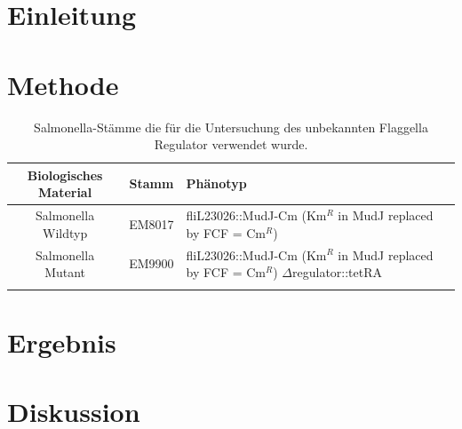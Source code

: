 \documentclass[oneside,10pt,a4paper]{report}
\begin{document}
		\section{Einleitung}
		
		\section{Methode}
			\begin{table}[H]
			\centering
			\caption{Salmonella-Stämme die für die Untersuchung des unbekannten Flaggella Regulator verwendet wurde.}
			\label{tab: exp8-biologisches Material}
			\begin{tabular}{ccp{5cm}}
				\toprule
				Biologisches Material& Stamm & Phänotyp\\
				\midrule
				\multirow{3}{*}{\parbox[t]{2cm}{Salmonella Wildtyp }}  & \multirow{3}{*}{EM8017} & \multirow{3}{*}{\parbox[t]{5cm}{fliL23026::MudJ-Cm (Km$^R$ in MudJ replaced by FCF = Cm$^R$)}}\\
				&&\\
				&&\\
				\multirow{3}{*}{\parbox[t]{2cm}{Salmonella Mutant}}  & \multirow{3}{*}{EM9900} & \multirow{3}{*}{\parbox[t]{5cm}{fliL23026::MudJ-Cm (Km$^R$ in MudJ replaced by FCF = Cm$^R$) $\Delta$regulator::tetRA}}\\
				&&\\
				&&\\
				&&\\
				\bottomrule			
			\end{tabular}
		\end{table}
		
		\section{Ergebnis}
		
		\section{Diskussion}

	
	
\end{document}
